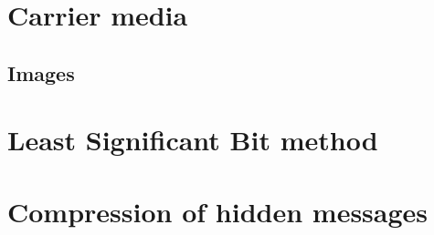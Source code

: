 

\section{Carrier media}

\subsection{Images}


\section{Least Significant Bit method}
\label{LSB}


\section{Compression of hidden messages}
\label{Compression}
